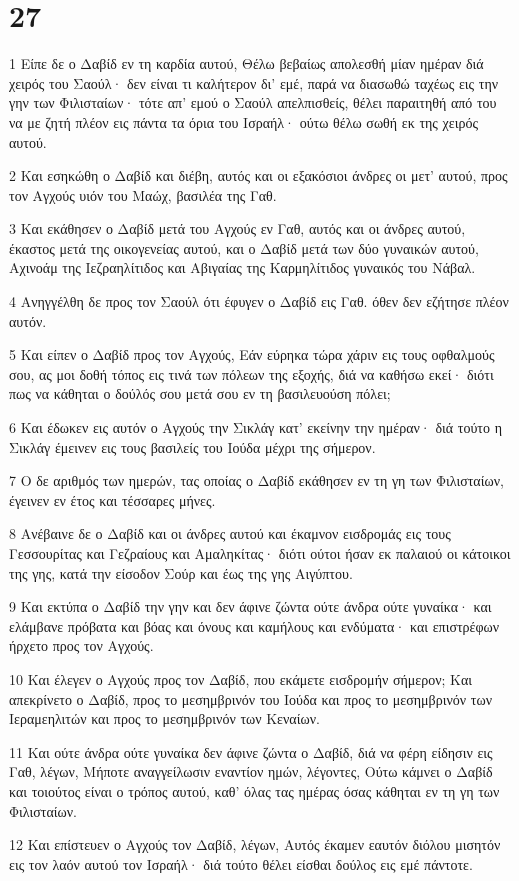 \chapter{27}

\par 1 Είπε δε ο Δαβίδ εν τη καρδία αυτού, Θέλω βεβαίως απολεσθή μίαν ημέραν διά χειρός του Σαούλ· δεν είναι τι καλήτερον δι' εμέ, παρά να διασωθώ ταχέως εις την γην των Φιλισταίων· τότε απ' εμού ο Σαούλ απελπισθείς, θέλει παραιτηθή από του να με ζητή πλέον εις πάντα τα όρια του Ισραήλ· ούτω θέλω σωθή εκ της χειρός αυτού.
\par 2 Και εσηκώθη ο Δαβίδ και διέβη, αυτός και οι εξακόσιοι άνδρες οι μετ' αυτού, προς τον Αγχούς υιόν του Μαώχ, βασιλέα της Γαθ.
\par 3 Και εκάθησεν ο Δαβίδ μετά του Αγχούς εν Γαθ, αυτός και οι άνδρες αυτού, έκαστος μετά της οικογενείας αυτού, και ο Δαβίδ μετά των δύο γυναικών αυτού, Αχινοάμ της Ιεζραηλίτιδος και Αβιγαίας της Καρμηλίτιδος γυναικός του Νάβαλ.
\par 4 Ανηγγέλθη δε προς τον Σαούλ ότι έφυγεν ο Δαβίδ εις Γαθ. όθεν δεν εζήτησε πλέον αυτόν.
\par 5 Και είπεν ο Δαβίδ προς τον Αγχούς, Εάν εύρηκα τώρα χάριν εις τους οφθαλμούς σου, ας μοι δοθή τόπος εις τινά των πόλεων της εξοχής, διά να καθήσω εκεί· διότι πως να κάθηται ο δούλός σου μετά σου εν τη βασιλευούση πόλει;
\par 6 Και έδωκεν εις αυτόν ο Αγχούς την Σικλάγ κατ' εκείνην την ημέραν· διά τούτο η Σικλάγ έμεινεν εις τους βασιλείς του Ιούδα μέχρι της σήμερον.
\par 7 Ο δε αριθμός των ημερών, τας οποίας ο Δαβίδ εκάθησεν εν τη γη των Φιλισταίων, έγεινεν εν έτος και τέσσαρες μήνες.
\par 8 Ανέβαινε δε ο Δαβίδ και οι άνδρες αυτού και έκαμνον εισδρομάς εις τους Γεσσουρίτας και Γεζραίους και Αμαληκίτας· διότι ούτοι ήσαν εκ παλαιού οι κάτοικοι της γης, κατά την είσοδον Σούρ και έως της γης Αιγύπτου.
\par 9 Και εκτύπα ο Δαβίδ την γην και δεν άφινε ζώντα ούτε άνδρα ούτε γυναίκα· και ελάμβανε πρόβατα και βόας και όνους και καμήλους και ενδύματα· και επιστρέφων ήρχετο προς τον Αγχούς.
\par 10 Και έλεγεν ο Αγχούς προς τον Δαβίδ, που εκάμετε εισδρομήν σήμερον; Και απεκρίνετο ο Δαβίδ, προς το μεσημβρινόν του Ιούδα και προς το μεσημβρινόν των Ιεραμεηλιτών και προς το μεσημβρινόν των Κεναίων.
\par 11 Και ούτε άνδρα ούτε γυναίκα δεν άφινε ζώντα ο Δαβίδ, διά να φέρη είδησιν εις Γαθ, λέγων, Μήποτε αναγγείλωσιν εναντίον ημών, λέγοντες, Ούτω κάμνει ο Δαβίδ και τοιούτος είναι ο τρόπος αυτού, καθ' όλας τας ημέρας όσας κάθηται εν τη γη των Φιλισταίων.
\par 12 Και επίστευεν ο Αγχούς τον Δαβίδ, λέγων, Αυτός έκαμεν εαυτόν διόλου μισητόν εις τον λαόν αυτού τον Ισραήλ· διά τούτο θέλει είσθαι δούλος εις εμέ πάντοτε.

